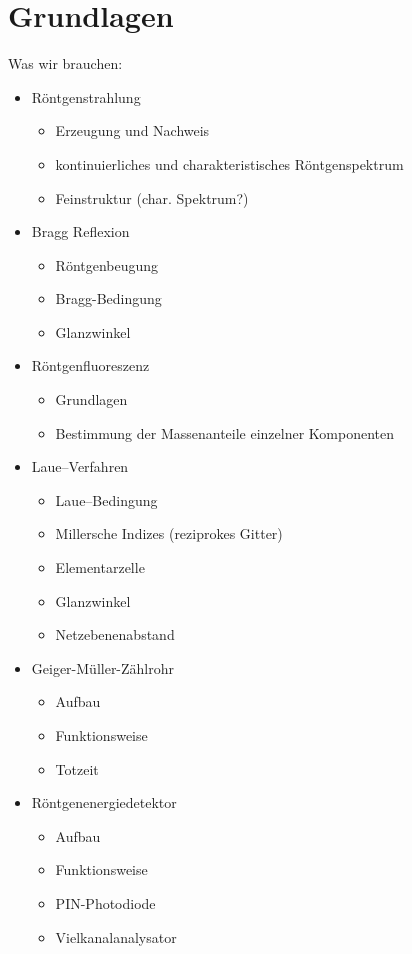 \documentclass[10pt, a4paper]{article}
\begin{document}
\section{Grundlagen}
Was wir brauchen:
\begin{itemize}
  \item Röntgenstrahlung
  \begin{itemize}
    \item Erzeugung und Nachweis
    \item kontinuierliches und charakteristisches Röntgenspektrum
    \item Feinstruktur (char. Spektrum?)
  \end{itemize}
  \item Bragg Reflexion
  \begin{itemize}
    \item Röntgenbeugung
    \item Bragg-Bedingung
    \item Glanzwinkel
  \end{itemize}
  \item Röntgenfluoreszenz
  \begin{itemize}
    \item Grundlagen
    \item Bestimmung der Massenanteile einzelner Komponenten
  \end{itemize}
  \item Laue--Verfahren
  \begin{itemize}
    \item Laue--Bedingung
    \item Millersche Indizes (reziprokes Gitter)
    \item Elementarzelle
    \item Glanzwinkel
    \item Netzebenenabstand
  \end{itemize}
  \item Geiger-Müller-Zählrohr
  \begin{itemize}
    \item Aufbau
    \item Funktionsweise
    \item Totzeit
  \end{itemize}
  \item Röntgenenergiedetektor
  \begin{itemize}
    \item Aufbau
    \item Funktionsweise
    \item PIN-Photodiode
    \item Vielkanalanalysator
  \end{itemize}
\end{itemize}
\end{document}
